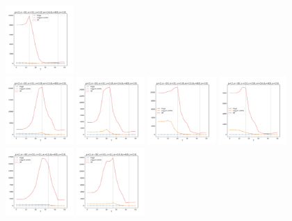 \documentclass[a4paper]{article}
\begin{document}
\begin{figure}[H]
  \includegraphics[width=0.23\textwidth]{grid-g2-v2-w4_0}
  \\
  \includegraphics[width=0.23\textwidth]{grid-g2-v3-w1_0}
  \includegraphics[width=0.23\textwidth]{grid-g2-v3-w2_0}
  \includegraphics[width=0.23\textwidth]{grid-g2-v3-w3_0}
  \includegraphics[width=0.23\textwidth]{grid-g2-v3-w4_0}
  \\
  \includegraphics[width=0.23\textwidth]{grid-g2-v4-w1_0}
  \includegraphics[width=0.23\textwidth]{grid-g2-v4-w2_0}

\end{figure}
\end{document}
